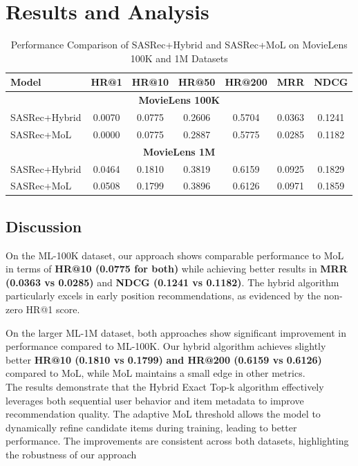 \section{Results and Analysis}
\begin{table}[h]
	\centering
	\large
	\renewcommand{\arraystretch}{1.3}
	\begin{tabular}{|l|c|c|c|c|c|c|}
		\hline
		\textbf{Model} & \textbf{HR@1} & \textbf{HR@10} & \textbf{HR@50} & \textbf{HR@200} & \textbf{MRR} & \textbf{NDCG} \\ \hline
		\multicolumn{7}{|c|}{\textbf{MovieLens 100K}} \\ \hline
		SASRec+Hybrid & 0.0070 & 0.0775 & 0.2606 & 0.5704 & 0.0363 & 0.1241 \\ \hline
		SASRec+MoL    & 0.0000 & 0.0775 & 0.2887 & 0.5775 & 0.0285 & 0.1182 \\ \hline
		\multicolumn{7}{|c|}{\textbf{MovieLens 1M}} \\ \hline
		SASRec+Hybrid & 0.0464 & 0.1810 & 0.3819 & 0.6159 & 0.0925 & 0.1829 \\ \hline
		SASRec+MoL    & 0.0508 & 0.1799 & 0.3896 & 0.6126 & 0.0971 & 0.1859 \\ \hline
	\end{tabular}
	\caption{Performance Comparison of SASRec+Hybrid and SASRec+MoL on MovieLens 100K and 1M Datasets}
	\label{tab:results_tab}
\end{table}
\subsection{Discussion}
On the ML-100K dataset, our approach shows comparable performance to MoL in terms of \textbf{HR@10 (0.0775 for both)} while achieving better results in\textbf{ MRR (0.0363 vs 0.0285)} and \textbf{NDCG (0.1241 vs 0.1182)}. The hybrid algorithm particularly excels in early position recommendations, as evidenced by the non-zero HR@1 score.

On the larger ML-1M dataset, both approaches show significant improvement in performance compared to ML-100K. Our hybrid algorithm achieves slightly better \textbf{HR@10 (0.1810 vs 0.1799)} \textbf{and HR@200 (0.6159 vs 0.6126)} compared to MoL, while MoL maintains a small edge in other metrics.\\


The results demonstrate that the Hybrid Exact Top-k algorithm effectively leverages both sequential user behavior and item metadata to improve recommendation quality. The adaptive MoL threshold allows the model to dynamically refine candidate items during training, leading to better performance. The improvements are consistent across both datasets, highlighting the robustness of our approach

